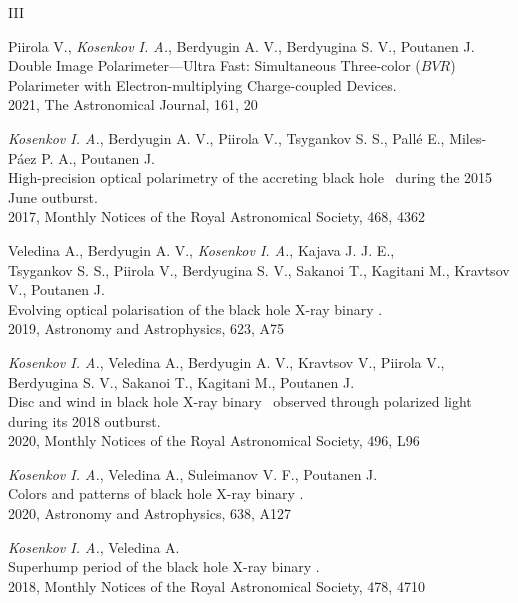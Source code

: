 \begin{entry}{III} %
    \item[I] Piirola V., \textit{Kosenkov I. A.}, Berdyugin A. V., Berdyugina S. V., Poutanen J. \\ Double Image Polarimeter—Ultra Fast: Simultaneous Three-color ($BVR$) Polarimeter with Electron-multiplying Charge-coupled Devices.\\ 2021, The Astronomical Journal, 161, 20
    \item[II] \textit{Kosenkov I. A.}, Berdyugin A. V., Piirola V., Tsygankov S. S., Pall\'e E., Miles-P\'aez P. A., Poutanen J.\\ High-precision optical polarimetry of the accreting black hole \VCYG\ during the 2015 June outburst.\\ 2017, Monthly Notices of the Royal Astronomical Society, 468, 4362
    \item[III] Veledina A., Berdyugin A. V., \textit{Kosenkov I. A.}, Kajava J. J. E.,\\ Tsygankov S. S., Piirola V., Berdyugina S. V., Sakanoi T., Kagitani M., Kravtsov V., Poutanen J.\\ Evolving optical polarisation of the black hole X-ray binary \MAXI.\\ 2019, Astronomy and Astrophysics, 623, A75
    \item[IV] \textit{Kosenkov I. A.}, Veledina A., Berdyugin A. V., Kravtsov V., Piirola V., Berdyugina S. V., Sakanoi T., Kagitani M., Poutanen J.\\ Disc and wind in black hole X-ray binary \MAXI\ observed through polarized light during its 2018 outburst.\\ 2020, Monthly Notices of the Royal Astronomical Society, 496, L96
    \item[V] \textit{Kosenkov I. A.}, Veledina A., Suleimanov V. F., Poutanen J.\\ Colors and patterns of black hole X-ray binary \GX.\\ 2020, Astronomy and Astrophysics, 638, A127
    \item[VI] \textit{Kosenkov I. A.}, Veledina A.\\ Superhump period of the black hole X-ray binary \GX.\\ 2018, Monthly Notices of the Royal Astronomical Society, 478, 4710
\end{entry}
\clearpage

